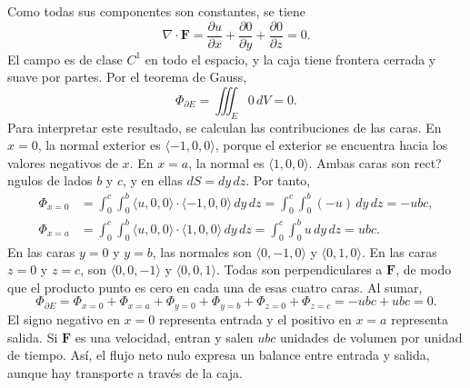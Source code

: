 Como todas sus componentes son constantes, se tiene
\[
\nabla\cdot\mathbf F
=\frac{\partial u}{\partial x}+\frac{\partial0}{\partial y}
+\frac{\partial0}{\partial z}=0.
\]
El campo es de clase $C^1$ en todo el espacio, y la caja tiene frontera cerrada y suave por partes. Por el teorema de Gauss,
\[
\Phi_{\partial E}=\iiint_E0\,dV=0.
\]
Para interpretar este resultado, se calculan las contribuciones de las caras. En $x=0$, la normal exterior es $\langle-1,0,0\rangle$, porque el exterior se encuentra hacia los valores negativos de $x$. En $x=a$, la normal es $\langle1,0,0\rangle$. Ambas caras son rect?ngulos de lados $b$ y $c$, y en ellas $dS=dy\,dz$. Por tanto,
\begin{align*}
\Phi_{x=0}
&=\int_0^c\int_0^b
\langle u,0,0\rangle\cdot\langle-1,0,0\rangle\,dy\,dz
=\int_0^c\int_0^b(-u)\,dy\,dz=-ubc,\\
\Phi_{x=a}
&=\int_0^c\int_0^b
\langle u,0,0\rangle\cdot\langle1,0,0\rangle\,dy\,dz
=\int_0^c\int_0^b u\,dy\,dz=ubc.
\end{align*}
En las caras $y=0$ y $y=b$, las normales son $\langle0,-1,0\rangle$ y $\langle0,1,0\rangle$. En las caras $z=0$ y $z=c$, son $\langle0,0,-1\rangle$ y $\langle0,0,1\rangle$. Todas son perpendiculares a $\mathbf F$, de modo que el producto punto es cero en cada una de esas cuatro caras. Al sumar,
\[
\Phi_{\partial E}=\Phi_{x=0}+\Phi_{x=a}
+\Phi_{y=0}+\Phi_{y=b}+\Phi_{z=0}+\Phi_{z=c}
=-ubc+ubc=0.
\]
El signo negativo en $x=0$ representa entrada y el positivo en $x=a$ representa salida. Si $\mathbf F$ es una velocidad, entran y salen $ubc$ unidades de volumen por unidad de tiempo. Así, el flujo neto nulo expresa un balance entre entrada y salida, aunque hay transporte a través de la caja.

\begingroup\shorthandoff{>}
\begin{center}
\end{center}
\endgroup

